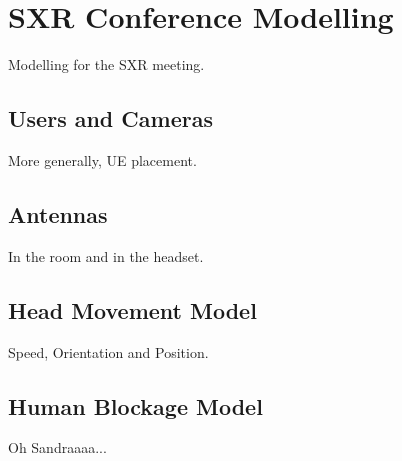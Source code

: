 \section{SXR Conference Modelling}
\label{sec:sxr_meeting_modelling}

Modelling for the SXR meeting.

\subsection{Users and Cameras}
\label{ue_placement}

More generally, UE placement.

\subsection{Antennas}

In the room and in the headset.

\subsection{Head Movement Model}

Speed, Orientation and Position.

\subsection{Human Blockage Model}

Oh Sandraaaa...